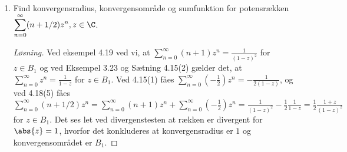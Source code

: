 \setcounter{section}{3}

\begin{opg}\hfill \\
	\begin{enumerate}
		\item Find konvergensradius, konvergensomr\aa{}de  og sumfunktion for potensr\ae{}kken $\displaystyle \sum_{n=0}^{\infty}(n+1/2)z^n ,  z\in\C $. %
			\ifanswers
			\begin{proof}[Løsning]
			Ved eksempel 4.19 ved vi, at $ \sum_{n=0}^{\infty}(n+1)z^n=\frac{1}{(1-z)^2} $ for $ z\in B_1 $ og ved Eksempel 3.23 og Sætning 4.15(2) gælder det, at $ \sum_{n=0}^{\infty}z^n=\frac{1}{1-z} $ for $ z\in B_1 $. Ved 4.15(1) fåes $ \sum_{n=0}^{\infty}(-\frac{1}{2})z^n=-\frac{1}{2(1-z)} $, og ved 4.18(5) fåes $ \sum_{n=0}^{\infty}(n+1/2)z^n=\sum_{n=0}^{\infty}(n+1)z^n+\sum_{n=0}^{\infty}(-\frac{1}{2})z^n=\frac{1}{(1-z)^2}-\frac{1}{2}\frac{1}{1-z}=\frac{1}{2}\frac{1+z}{(1-z)^2}  $ for $ z\in B_1 $. Det ses let ved divergenstesten at rækken er divergent for $ \abs{z}=1 $, hvorfor det konkluderes at konvergensradius er $ 1 $ og konvergensområdet er $ B_1 $. 
				\end{proof}
			\fi


\end{enumerate}
\end{opg}

